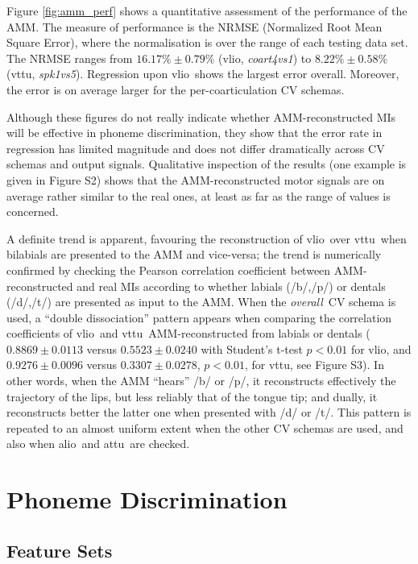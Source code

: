 \documentclass{pnastwo}
\newcommand{\vlio}{\textsf{vlio}}
\newcommand{\vttu}{\textsf{vttu}}
\newcommand{\alio}{\textsf{alio}}
\newcommand{\attu}{\textsf{attu}}
\newcommand{\overall}{\emph{overall}}
\newcommand{\spkc}{\emph{spk1vs5}}
\newcommand{\coa}{\emph{coart4vs1}}
\begin{document}
\begin{article}
Figure \ref{fig:amm_perf} shows a quantitative assessment of the performance
of the AMM. The measure of performance is the NRMSE (Normalized Root Mean Square Error),
where the normalisation is over the range of each testing data set. The NRMSE
ranges from $16.17\% \pm 0.79\%$ (\vlio, \coa) to $8.22\% \pm 0.58\%$ (\vttu, \spkc).
Regression upon \vlio\ shows the largest error overall. Moreover, the error is on average
larger for the per-coarticulation CV schemas.

Although these figures do not really indicate whether AMM-reconstructed MIs will be
effective in phoneme discrimination, they show that the error rate in regression has
limited magnitude and does not differ dramatically across CV schemas and output signals.
Qualitative inspection of the results (one example is given in Figure S2) shows that 
the AMM-reconstructed motor signals are on average rather similar to the real ones,
 at least as far as the range of values is concerned.

A definite trend is apparent, favouring the reconstruction of \vlio\ over \vttu\ when
bilabials are presented to the AMM and vice-versa; the trend is numerically confirmed
by checking the Pearson correlation coefficient between AMM-reconstructed and real MIs
according to whether labials (/b/,/p/) or dentals (/d/,/t/) are presented as input
to the AMM. When the \overall\ CV schema is used,
a ``double dissociation'' pattern appears when comparing the correlation coefficients of
\vlio\ and \vttu\ AMM-reconstructed from labials or dentals
($0.8869 \pm 0.0113$ versus $0.5523 \pm 0.0240$ with Student's t-test $p<0.01$ for \vlio, and
 $0.9276 \pm 0.0096$ versus $0.3307 \pm 0.0278$, $p<0.01$, for \vttu, see Figure S3).
In other words, when the AMM ``hears'' /b/ or /p/, it reconstructs effectively the trajectory of the lips,
but less reliably that of the tongue tip; and dually, it reconstructs better the latter one when
presented with /d/ or /t/. This pattern is repeated to an almost uniform extent when the
other CV schemas are used, and also when \alio\ and \attu\ are checked.

\section{Phoneme Discrimination}
\label{sec:class}

\subsection{Feature Sets}
\label{subsec:featset}


\end{article}
\end{document}
